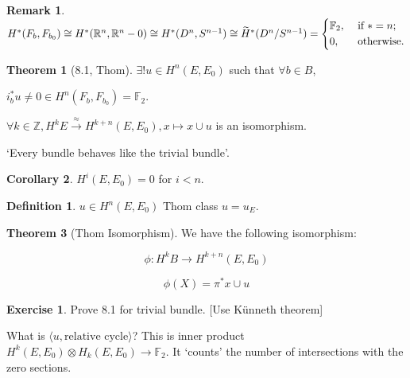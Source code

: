 \documentclass{article}
\theoremstyle{definition}
\newtheorem*{exercise}{Exercise}
\newtheorem*{definition}{Definition}
\newtheorem{theorem}{Theorem}
\newtheorem{corollary}[theorem]{Corollary}
\newtheorem*{remark}{Remark}
\begin{document}
    \begin{remark}
        \(H^{\ast} (F_b, F_{b_0}) \cong H^{\ast} (\mathbb{R}^n, \mathbb{R}^n - 0) \cong H^{\ast} (D^n, S^{n-1}) \cong \widetilde{H}^{\ast} (D^n / S^{n-1}) = \begin{dcases}
            \mathbb{F}_2, &\text{ if } \ast = n ;\\
            0, &\text{ otherwise} .
        \end{dcases} \) 
    \end{remark}

    \begin{theorem}
        [8.1, Thom] \(\exists ! u\in H^n(E,E_0)\) such that \(\forall b\in B\), 
        
        \(i_b^{\ast} u \neq 0 \in H^n(F_b, F_{b_0}) = \mathbb{F}_2\).

        \(\forall k\in \mathbb{Z}, H^k E \xrightarrow{\approx} H^{k+n} (E,E_0), x \mapsto x \cup u\) is an isomorphism.
    \end{theorem}

    `Every bundle behaves like the trivial bundle'.

    \begin{corollary}
        \(H^i(E,E_0)=0\) for \(i < n\).
    \end{corollary}

    \begin{definition}
        \(u \in H^n(E,E_0)\) Thom class \(u = u_E\).
    \end{definition}

    \begin{theorem}
        [Thom Isomorphism]

        We have the following isomorphism:

        \[
            \phi : H^k B \to H^{k+n} (E,E_0)
        \]

        \[
            \phi(X) = \pi^{\ast} x \cup u
        \]
    \end{theorem}

    \begin{exercise}
        Prove 8.1 for trivial bundle. [Use K\"unneth theorem]
    \end{exercise}

    What is \(\langle u, \text{relative cycle} \rangle\)? This is inner product \(H^k(E,E_0) \otimes H_k(E,E_0) \to \mathbb{F}_2\). It `counts' the number of intersections with the zero sections.
\end{document}
